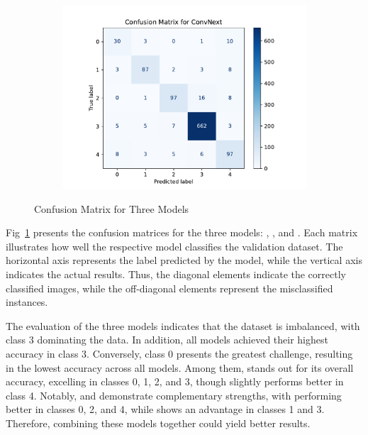 \begin{figure}[htbp]
\begin{subfigure}{0.32\textwidth}
        \caption{\CROP}
    \end{subfigure}
    \begin{subfigure}{0.32\textwidth}
        \centering
        \includegraphics[width=\linewidth]{graphs/ModelMergeStudy/ConvNext.pdf}
        \caption{\CONV}
    \end{subfigure}
    \caption{Confusion Matrix for Three Models}
    \label{confusionMatrix}
\end{figure}

Fig~\ref{confusionMatrix} presents the confusion matrices for the three models: \VIT{}, \CROP{}, and \CONV{}. Each matrix illustrates how well the respective model classifies the validation dataset. The horizontal axis represents the label predicted by the model, while the vertical axis indicates the actual results. Thus, the diagonal elements indicate the correctly classified images, while the off-diagonal elements represent the misclassified instances.

The evaluation of the three models indicates that the dataset is imbalanced, with class 3 dominating the data. In addition, all models achieved their highest accuracy in class 3. Conversely, class 0 presents the greatest challenge, resulting in the lowest accuracy across all models. Among them, \CONV{} stands out for its overall accuracy, excelling in classes 0, 1, 2, and 3, though \CROP{} slightly performs better in class 4. Notably, \CROP{} and \VIT{} demonstrate complementary strengths, with \CROP{} performing better in classes 0, 2, and 4, while \VIT{} shows an advantage in classes 1 and 3. Therefore, combining these models together could yield better results.
